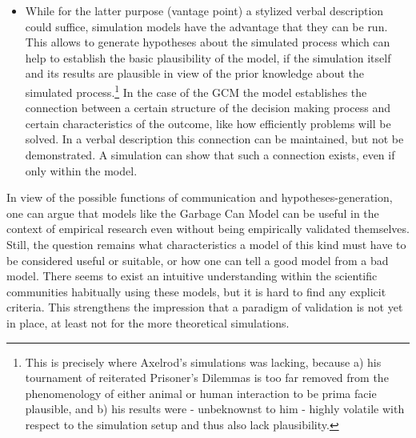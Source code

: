 \documentclass[12pt, a4paper]{article}
\begin{document}
\begin{itemize}

  \item While for the latter purpose (vantage point) a stylized verbal
  description could suffice, simulation models have the advantage that
  they can be run. This allows to generate hypotheses about the
  simulated process which
  can help to establish the basic plausibility of the model, if the
  simulation itself and its results are plausible in view of the prior
  knowledge about the simulated process.\footnote{This is precisely
  where Axelrod's simulations was lacking, because a) his tournament
  of reiterated Prisoner's Dilemmas is too far removed from the
  phenomenology of either animal or human interaction to be prima
  facie plausible, and b) his results were - unbeknownst to him -
  highly volatile with respect to the simulation setup and thus also
  lack plausibility.} In the case of the GCM the model establishes the
  connection between a certain structure of the decision making
  process and certain characteristics of the outcome, like how
  efficiently problems will be solved. In a verbal description this
  connection can be maintained, but not be demonstrated. A simulation
  can show that such a connection exists, even if only within the
  model.

\end{itemize}

In view of the possible functions of communication and
hypotheses-generation, one can argue that models like the Garbage Can
Model can be useful in the context of empirical research even without
being empirically validated themselves. Still, the question remains
what characteristics a model of this kind must have to be considered
useful or suitable, or how one can tell a good model from a bad model.
There seems to exist an intuitive understanding within the scientific
communities habitually using these models, but it is hard to find any
explicit criteria. This strengthens the impression that a paradigm of
validation is not yet in place, at least not for the more theoretical
simulations.
\end{document}
